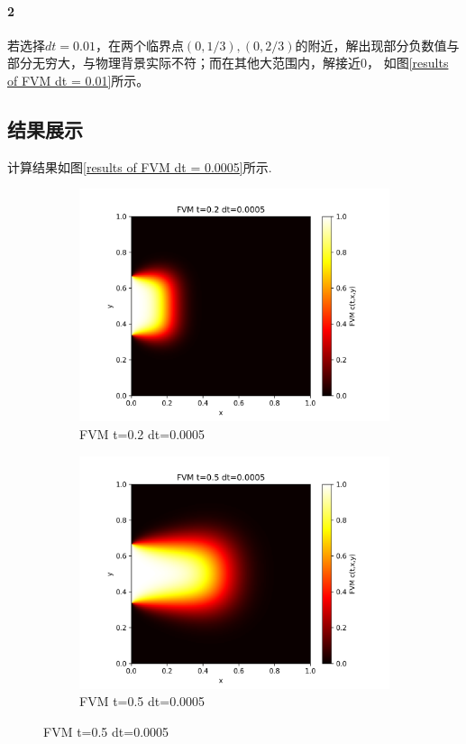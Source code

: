 \documentclass[11pt,a4 paper,one side]{article}
\begin{document}
\paragraph{2} 若选择$dt=0.01$，在两个临界点$(0,1/3),(0,2/3)$的附近，解出现部分负数值与部分无穷大，与物理背景实际不符；而在其他大范围内，解接近$0$，
如图\ref{results of FVM dt = 0.01}所示。
\subsection{结果展示}
计算结果如图\ref{results of FVM dt = 0.0005}所示.\begin{figure}[htbp]
    \centering
    \begin{subfigure}{0.45\textwidth}
        \includegraphics[width=\textwidth]{FVM t=0.2 dt=0.0005.png}
        \caption{FVM t=0.2 dt=0.0005}
        \label{FVM t=0.2 dt=0.0005}
    \end{subfigure}
    \hfill
    \begin{subfigure}{0.45\textwidth}
        \includegraphics[width=\textwidth]{FVM t=0.5 dt=0.0005.png}
        \caption{FVM t=0.5 dt=0.0005}
        \label{FVM t=0.5 dt=0.0005}
    \end{subfigure}
    

\end{figure}
\end{document}
